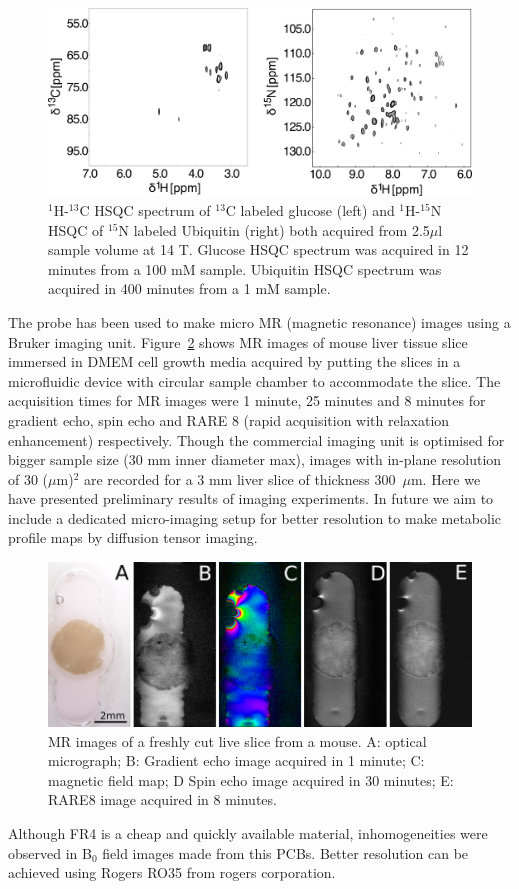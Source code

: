 \documentclass[preprint,12pt]{article}
\begin{document}
\begin{figure}
\centering
\includegraphics[width=.7\linewidth,keepaspectratio=true]{./figures/ms5n17-tlp-sp-180612-HSQCspect.png} 
\caption{$^1$H-$^{13}$C HSQC spectrum of $^{13}$C labeled glucose (left) and $^1$H-$^{15}$N HSQC of $^{15}$N labeled Ubiquitin (right) both acquired from 2.5$\mu$l sample volume at 14 T. Glucose HSQC spectrum was acquired in 12 minutes from a 100 mM sample. Ubiquitin HSQC spectrum was acquired in 400 minutes from a 1 mM sample.}
\label{fig:HSQC} 
\end{figure}
The probe has been used to make micro MR (magnetic resonance) images using a Bruker imaging unit. Figure~\ref{fig:tisli} shows MR images of mouse liver tissue slice immersed in DMEM cell growth media acquired by putting the slices in a microfluidic device with circular sample chamber to accommodate the slice. The acquisition times for MR images were 1 minute, 25 minutes and 8 minutes for gradient echo, spin echo and RARE 8 (rapid acquisition with relaxation enhancement) respectively. Though the commercial imaging unit is optimised for bigger sample size (30 mm inner diameter max), images with in-plane resolution of 30 ($\mu$m)$^{2}$ are recorded for a 3 mm liver slice of thickness 300~$\mu$m. Here we have presented preliminary results of imaging experiments. In future we aim to include a dedicated micro-imaging setup for better resolution to make metabolic profile maps by diffusion tensor imaging.
\begin{figure}
\centering
\includegraphics[width=.7\linewidth,keepaspectratio=true]{./figures/ms5n17-tisli-im-180511.png} 
\caption{MR images of a freshly cut live slice from a mouse. A: optical micrograph; B: Gradient echo image acquired in 1 minute; C: magnetic field map; D Spin echo image acquired in 30 minutes; E: RARE8 image acquired in 8 minutes.}
\label{fig:tisli} 
\end{figure}
Although FR4 is a cheap and quickly available material, inhomogeneities were observed in B$_0$ field images made from this PCBs. Better resolution can be achieved using Rogers RO35 from rogers corporation.
\end{document}
